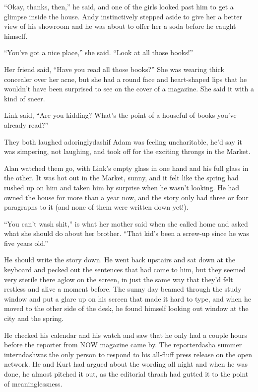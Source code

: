 ``Okay, thanks, then,'' he said, and one of the girls looked past him
to get a glimpse inside the house.  Andy instinctively stepped aside
to give her a better view of his showroom and he was about to offer
her a soda before he caught himself.

``You've got a nice place,'' she said.  ``Look at all those books!''

Her friend said, ``Have you read all those books?'' She was wearing
thick concealer over her acne, but she had a round face and
heart-shaped lips that he wouldn't have been surprised to see on the
cover of a magazine.  She said it with a kind of sneer.

Link said, ``Are you kidding?  What's the point of a houseful of books
you've already read?''

They both laughed adoringlydash{}if Adam was feeling uncharitable, he'd
say it was simpering, not laughing, and took off for the exciting
throngs in the Market.

Alan watched them go, with Link's empty glass in one hand and his full
glass in the other.  It was hot out in the Market, sunny, and it felt
like the spring had rushed up on him and taken him by surprise when he
wasn't looking.  He had owned the house for more than a year now, and
the story only had three or four paragraphs to it (and none of them
were written down yet!).

``You can't wash shit,'' is what her mother said when she called home
and asked what she should do about her brother.  ``That kid's been a
screw-up since he was five years old.''

He should write the story down.  He went back upstairs and sat down at
the keyboard and pecked out the sentences that had come to him, but
they seemed very sterile there aglow on the screen, in just the same
way that they'd felt restless and alive a moment before.  The sunny
day beamed through the study window and put a glare up on his screen
that made it hard to type, and when he moved to the other side of the
desk, he found himself looking out window at the city and the spring.

He checked his calendar and his watch and saw that he only had a
couple hours before the reporter from NOW magazine came by.  The
reporterdash{}a summer interndash{}was the only person to respond to his
all-fluff press release on the open network.  He and Kurt had argued
about the wording all night and when he was done, he almost pitched it
out, as the editorial thrash had gutted it to the point of
meaninglessness.

